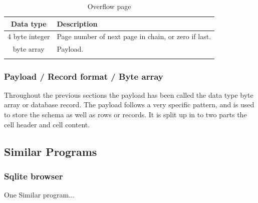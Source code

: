 \begin{longtable}[h]{| c | p{5cm} |}
		\hline
			\textbf{Data type} & \textbf{Description} \\ 
		\hline
		\endhead
			4 byte integer & Page number of next page in chain, or zero if last. \\
		\hline
			byte array & Payload. \\
		\hline
	\caption{Overflow page}
	\label{tbl:overflow_page}
\end{longtable}

\subsubsection{Payload / Record format / Byte array}
\label{subsubsec:record_format}

Throughout the previous sections the payload has been called the data type byte array or database record. The payload follows a very specific pattern, and is used to store the schema as well as rows or records. It is split up in to two parts the cell header and cell content.

\subsection{Similar Programs}
\label{subsec:similar_programs}

\subsubsection{Sqlite browser}
\label{subsubsec:sqlite_browser}

One Similar program...
